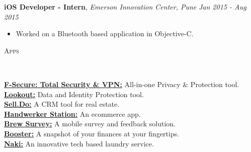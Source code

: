 \documentclass[9pt]{article}
\newenvironment{changemargin}[2]{%
  \begin{list}{}{%
    \setlength{\topsep}{0pt}%
    \setlength{\leftmargin}{#1}%
    \setlength{\rightmargin}{#2}%
    \setlength{\listparindent}{\parindent}%
    \setlength{\itemindent}{\parindent}%
    \setlength{\parsep}{\parskip}%
  }%
  \item[]}{\end{list}
}
\newcommand{\lineover}{
    \begin{changemargin}{-0.05in}{-0.05in}
        \vspace*{-8pt}
        \hrulefill \\
        \vspace*{-2pt}
    \end{changemargin}
}
\newcommand{\header}[1]{
    \begin{changemargin}{-0.5in}{-0.5in}
        \scshape{#1}\\
    \lineover
    \end{changemargin}
}
\newenvironment{body} {
    \vspace*{-16pt}
    \begin{changemargin}{-0.25in}{-0.5in}
  }
    {\end{changemargin}
}
\begin{document}
\begin{body}
    \vspace{14pt}
    \textbf{iOS Developer - Intern}, \emph{Emerson Innovation Center, Pune} \hfill \emph{Jan 2015 - Aug 2015}\\
    \vspace*{-4pt}
    \begin{itemize} \itemsep -0pt  %
        \item Worked on a Bluetooth based application in Objective-C.
    \end{itemize}

\end{body}

\smallskip


\header{Apps}

\begin{body}
    \vspace{14pt}
    \href{https://apps.apple.com/nl/app/f-secure-total-security-vpn/id572847748}{\textbf{F-Secure: Total Security & VPN:}}{} All-in-one Privacy & Protection tool. \\
    \vspace{14pt}
    \href{https://apps.apple.com/us/app/mobile-security-lookout/id434893913}{\textbf{Lookout:}}{} Data and Identity Protection tool. \\
    \vspace{2pt}
    \href{https://apps.apple.com/us/app/sell-do/id1225486345}{\textbf{Sell.Do:}}{} A CRM tool for real estate. \\
    \vspace*{2pt}
    \href{https://apps.apple.com/us/app/handwerkerstation/id1247972146}{\textbf{Handwerker Station:}}{} An ecommerce app. \\
    \vspace*{2pt}
    \href{https://apps.apple.com/us/app/brew-survey-offline-feedback/id1207197946}{\textbf{Brew Survey:}}{} A mobile survey and feedback solution. \\
    \vspace*{2pt}
    \href{https://itunes.apple.com/nz/app/booster-nz/id1179170506?mt=8}{\textbf{Booster:}}{} A snapshot of your finances at your fingertips. \\
    \vspace*{2pt}
    \href{https://itunes.apple.com/in/app/naki-laundry/id621934237?mt=8}{\textbf{Naki:}}{} An innovative tech based laundry service. \\
\end{body}
\end{document}
